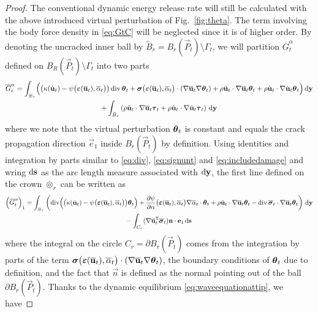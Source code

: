 \begin{proof}
The conventional dynamic energy release rate will still be calculated with the above introduced virtual perturbation of Fig.~\ref{fig:theta}. The term involving the body force density in \eqref{eq:GtC} will be neglected since it is of higher order. By denoting the uncracked inner ball by $\tilde{B}_r=B_r(\vec{P}_t)\setminus\Gamma_t$, we will partition $\overline{G}^\alpha_t$ defined on $B_R(\vec{P}_t)\setminus\Gamma_t$ into two parts
\begin{multline} \label{eq:Galphaintwoparts}
\overline{G}^\alpha_t=\int_{\circledcirc_r}\Bigl(\bigl(\kappa(\dot{\vec{u}}_t)-\psi\bigl(\eps(\overline{\vec{u}}_t),\overline{\alpha}_t\bigr)\bigr)\div\vtheta_t+\sig\bigl(\eps(\overline{\vec{u}}_t),\overline{\alpha}_t\bigr)\cdot(\nabla\overline{\vec{u}}_t\nabla\vtheta_t)+\rho\ddot{\vec{u}}_t\cdot\nabla\overline{\vec{u}}_t\vtheta_t+\rho\dot{\vec{u}}_t\cdot\nabla\dot{\vec{u}}_t\vtheta_t\Bigr)\D{\vec{y}} \\
+\int_{\tilde{B}_r}\left(\rho\ddot{\vec{u}}_t\cdot\nabla\overline{\vec{u}}_t\vtau_t+\rho\dot{\vec{u}}_t\cdot\nabla\dot{\vec{u}}_t\vtau_t\right)\D{\vec{y}}
\end{multline}
where we note that the virtual perturbation $\vtheta_t$ is constant and equals the crack propagation direction $\vec{e}_1$ inside $B_r(\vec{P}_t)$ by definition. Using identities and integration by parts similar to \eqref{eq:div}, \eqref{eq:signunt} and \eqref{eq:includedamage} and wring $\md\vec{s}$ as the arc length measure associated with $\md\vec{y}$, the first line defined on the crown $\circledcirc_r$ can be written as
\begin{multline*}
\left(\overline{G}^\alpha_t\right)_1=\int_{\circledcirc_r}\left(\div\Bigl(\bigl(\kappa(\dot{\vec{u}}_t)-\psi\bigl(\eps(\overline{\vec{u}}_t),\overline{\alpha}_t\bigr)\bigr)\vtheta_t\Bigr)+\frac{\partial\psi}{\partial\alpha}\bigl(\eps(\overline{\vec{u}}_t),\overline{\alpha}_t\bigr)\nabla\overline{\alpha}_t\cdot\vtheta_t+\rho\ddot{\vec{u}}_t\cdot\nabla\overline{\vec{u}}_t\vtheta_t-\div\overline{\sig}_t\cdot\nabla\overline{\vec{u}}_t\vtheta_t\right)\D{\vec{y}} \\
-\int_{C_r}(\nabla\overline{\vec{u}}_t^\mT\overline{\sig}_t)\vec{n}\cdot\vec{e}_1\D{\vec{s}}
\end{multline*}
where the integral on the circle $C_r=\partial B_r(\vec{P}_t)$ comes from the integration by parts of the term $\sig\bigl(\eps(\overline{\vec{u}}_t),\overline{\alpha}_t\bigr)\cdot(\nabla\overline{\vec{u}}_t\nabla\vtheta_t)$, the boundary conditions of $\vtheta_t$ due to definition, and the fact that $\vec{n}$ is defined as the normal pointing out of the ball $\partial B_r(\vec{P}_t)$. Thanks to the dynamic equilibrium \eqref{eq:waveequationattip}, we have

\end{proof}
